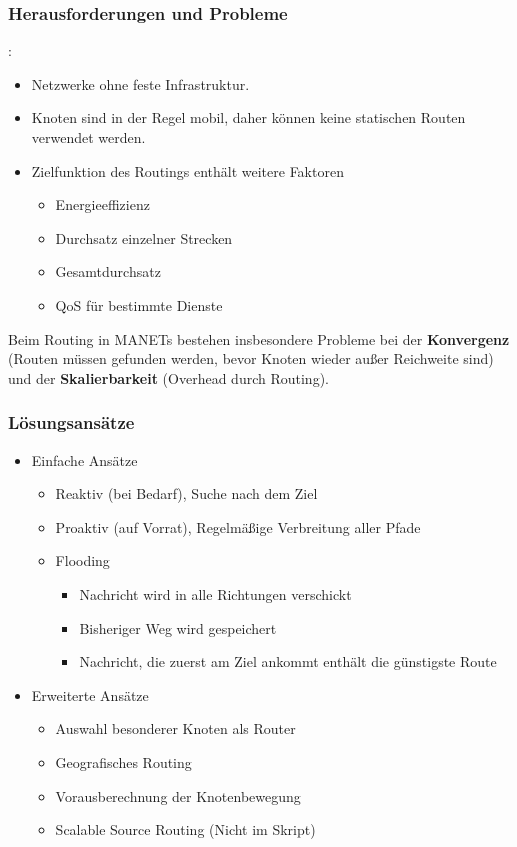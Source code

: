 \documentclass{article} %
\begin{document}
\subsubsection{Herausforderungen und Probleme}:
\begin{itemize}
	\item Netzwerke ohne feste Infrastruktur.
	\item Knoten sind in der Regel mobil, daher können keine statischen Routen verwendet werden.
	\item Zielfunktion des Routings enthält weitere Faktoren
	\begin{itemize}
		\item Energieeffizienz
		\item Durchsatz einzelner Strecken
		\item Gesamtdurchsatz
		\item QoS für bestimmte Dienste
	\end{itemize}
\end{itemize}
Beim Routing in MANETs bestehen insbesondere Probleme bei der \textbf{Konvergenz} (Routen müssen gefunden werden, bevor Knoten wieder außer Reichweite sind) und der \textbf{Skalierbarkeit} (Overhead durch Routing).
\subsubsection{Lösungsansätze}
\begin{itemize}
	\item Einfache Ansätze
	\begin{itemize}
		\item Reaktiv (bei Bedarf), Suche nach dem Ziel
		\item Proaktiv (auf Vorrat), Regelmäßige Verbreitung aller Pfade
		\item Flooding
		\begin{itemize}
			\item Nachricht wird in alle Richtungen verschickt
			\item Bisheriger Weg wird gespeichert
			\item Nachricht, die zuerst am Ziel ankommt enthält die günstigste Route
		\end{itemize}
	\end{itemize}
	\item Erweiterte Ansätze
	\begin{itemize}
		\item Auswahl besonderer Knoten als Router
		\item Geografisches Routing
		\item Vorausberechnung der Knotenbewegung
		\item Scalable Source Routing\cite{fuhrmann2007performance} (Nicht im Skript)
	\end{itemize}
\end{itemize}
\end{document}
